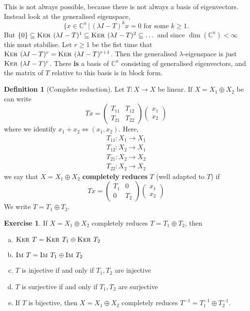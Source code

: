 \documentclass[10pt, oneside, reqno]{amsbook}
\theoremstyle{plain}%
\theoremstyle{definition}
\newtheorem{defn}[thm]{Definition}
\newtheorem{exer}[thm]{Exercise}
\theoremstyle{remark}
\newcommand{\given}{ \, | \,}
\newcommand{\Com}{\mathbb{C}}
\newcommand{\im}{\textsc{Im\ }}
\renewcommand{\ker}{\textsc{Ker\ }}
\begin{document}
This is not always possible, because there is not always a basis of eigenvectors.  Instead look at the generalised eigenspace, \[
    \{ x \in \Com^n \given \text{$(\lambda I - T)^k x = 0$ for some $k \geq 1$}.  
\] 
But $\{ 0 \} \subseteq \ker(\lambda I - T)^1 \subseteq \ker(\lambda I - T)^2 \subseteq \dots$
 and since $\dim(\Com^n) < \infty$ this must stabilise.  Let $r \geq 1$ be the fist time that $\ker (\lambda I - T)^r = \ker( \lambda I - T)^{r+1}$.  Then the generalised $\lambda$-eigenspace is just $\ker(\lambda I - T)^r$.  There \textbf{is} a basis of $\Com^n$ consisting of generalised eigenvectors, and the matrix of $T$ relative to this basis is in block form.  

\begin{defn}[Complete reduction]
    Let $T: X \rightarrow X$ be linear.  If $X = X_1 \oplus X_2$ be can write \[
        Tx = \begin{pmatrix}
            T_{11} & T_{12} \\
            T_{21} & T_{22}
        \end{pmatrix} \begin{pmatrix}
            x_1 \\
            x_2
        \end{pmatrix}
    \] where we identify $x_1 + x_2 \iff (x_1, x_2)$.  Here, \begin{align*}
        T_{11}: X_1 \rightarrow X_1 \\
        T_{12}: X_2 \rightarrow X_1 \\
        T_{21} : X_2 \rightarrow X_2 \\
        T_{22} : X_2 \rightarrow X_2
    \end{align*} we say that $X = X_1 \oplus X_2$ \textbf{completely reduces} $T$ (well adapted to $T$) if \[
        Tx = \begin{pmatrix}
            T_1 & 0 \\
            0   & T_2 
        \end{pmatrix} \begin{pmatrix}
            x_1 \\
            x_2
        \end{pmatrix}
    \]  We write $T = T_1 \oplus T_2$.
\end{defn}

\begin{exer}
    If $X = X_1 \oplus X_2$ completely reduces $T = T_1 \oplus T_2$, then \begin{enumerate}[(a)]
        \item $\ker T = \ker T_1 \oplus \ker T_2$ 
        \item $\im T = \im T_1 \oplus \im T_2$
        \item $T$ is injective if and only if $T_1, T_2$ are injective
        \item $T$ is surjective if and only if $T_1, T_2$ are surjective
        \item If $T$ is bijective, then $X = X_1 \oplus X_2$ completely reduces $T^{-1} = T_1^{-1} \oplus T^{-1}_2$.
    \end{enumerate}
\end{exer}
\end{document}
